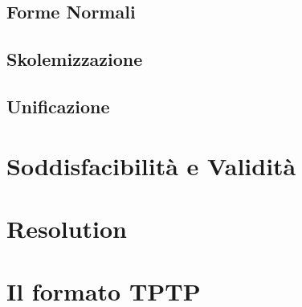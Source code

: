 \documentclass[./main.tex]{subfiles}
\begin{document}
    \subsection{Forme Normali}
    \subsection{Skolemizzazione}
    \subsection{Unificazione}

\section{Soddisfacibilità e Validità}

\section{Resolution}
\section{Il formato TPTP}
\end{document}
